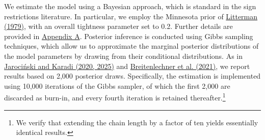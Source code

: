 \documentclass[\latexroot/\projectname]{subfiles}
\begin{document}
We estimate the model using a Bayesian approach, which is standard in the sign restrictions literature. In particular, we employ the Minnesota prior of \hyperlink{Litterman (1979)}{Litterman (1979)}, with an overall tightness parameter set to 0.2. Further details are provided in \hyperlink{Appendix A}{Appendix A}. Posterior inference is conducted using Gibbs sampling techniques, which allow us to approximate the marginal posterior distributions of the model parameters by drawing from their conditional distributions. As in \hyperlink{JK (2020)}{Jarociński and Karadi (2020, 2025)} and \hyperlink{Breitenlechner (2021)}{Breitenlechner et al. (2021)}, we report results based on 2{,}000 posterior draws. Specifically, the estimation is implemented using 10{,}000 iterations of the Gibbs sampler, of which the first 2{,}000 are discarded as burn-in, and every fourth iteration is retained thereafter.\footnote{We verify that extending the chain length by a factor of ten yields essentially identical results.}
\end{document}
